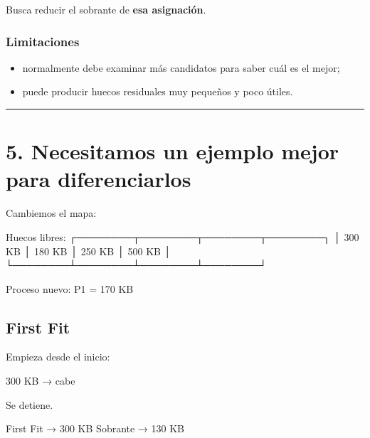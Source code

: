 \documentclass[
  spanish,
  letterpaper,
]{scrbook}
\newenvironment{Shaded}{\begin{snugshade}}{\end{snugshade}}
\newcommand{\NormalTok}[1]{\textcolor[rgb]{0.00,0.23,0.31}{#1}}
\providecommand{\tightlist}{%
  \setlength{\itemsep}{0pt}\setlength{\parskip}{0pt}}
\begin{document}
Busca reducir el sobrante de \textbf{esa asignación}.

\subsection{Limitaciones}\label{limitaciones-3}

\begin{itemize}
\tightlist
\item
  normalmente debe examinar más candidatos para saber cuál es el mejor;
\item
  puede producir huecos residuales muy pequeños y poco útiles.
\end{itemize}

\begin{center}\rule{0.5\linewidth}{0.5pt}\end{center}


\chapter{5. Necesitamos un ejemplo mejor para
diferenciarlos}\label{necesitamos-un-ejemplo-mejor-para-diferenciarlos}

Cambiemos el mapa:

\begin{Shaded}
\begin{Highlighting}[]
\NormalTok{Huecos libres:}
\NormalTok{┌────────┬────────┬────────┬────────┐}
\NormalTok{│ 300 KB │ 180 KB │ 250 KB │ 500 KB │}
\NormalTok{└────────┴────────┴────────┴────────┘}

\NormalTok{Proceso nuevo:}
\NormalTok{P1 = 170 KB}
\end{Highlighting}
\end{Shaded}

\section{First Fit}\label{first-fit-1}

Empieza desde el inicio:

\begin{Shaded}
\begin{Highlighting}[]
\NormalTok{300 KB → cabe}
\end{Highlighting}
\end{Shaded}

Se detiene.

\begin{Shaded}
\begin{Highlighting}[]
\NormalTok{First Fit → 300 KB}
\NormalTok{Sobrante  → 130 KB}
\end{Highlighting}
\end{Shaded}
\end{document}
